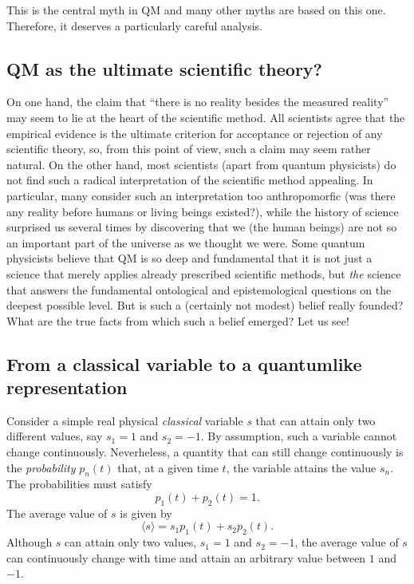 \documentclass[12pt]{article}
\begin{document}
This is the central myth in QM and many other myths are based 
on this one. Therefore, it deserves a particularly careful 
analysis.

\subsection{QM as the ultimate scientific theory?}

On one hand, the claim that
``there is no reality besides the measured reality''
may seem to lie at the heart of the scientific method. 
All scientists agree that the empirical evidence is the 
ultimate criterion for acceptance or rejection of any 
scientific theory, so, from this point of view, such a claim
may seem rather natural. 
On the other hand, most scientists (apart from quantum physicists) 
do not find such a radical interpretation of the scientific method
appealing. In particular, many consider such an interpretation too 
anthropomorfic (was there any reality before humans or living beings
existed?), while the history of science surprised us several times
by discovering that we (the human beings) are not so an important 
part of the universe as we thought we were. 
Some quantum physicists believe that QM is so 
deep and fundamental that it is not just a science that merely applies 
already prescribed scientific methods, but {\em the} science that 
answers the fundamental ontological and epistemological questions 
on the deepest possible level.
But is such a (certainly not modest) belief really founded? 
What are the true facts from which such a belief emerged? 
Let us see!  

\subsection{From a classical variable to a quantumlike representation}

Consider a simple real physical {\em classical}
variable $s$ that can attain only 
two different values, say $s_1=1$ and $s_2=-1$.
By assumption, such a variable cannot change continuously.
Neverheless, a quantity that can still change continuously
is the {\em probability} $p_n(t)$ that, at a 
given time $t$, the variable attains the value $s_n$.
The probabilities must satisfy
\begin{equation}\label{prob}
p_1(t) + p_2(t)=1 .
\end{equation}
The average value of $s$ is given by
\begin{equation}\label{av}
\langle s \rangle  = s_1p_1(t)+s_2p_2(t) .
\end{equation}
Although $s$ can attain only two values, $s_1=1$ and $s_2=-1$, 
the average value of $s$ can continuously change with time and attain 
an arbitrary value between $1$ and $-1$.  
\end{document}
